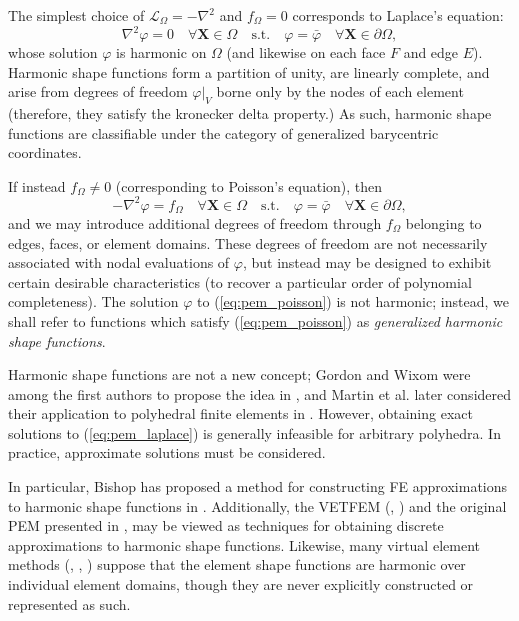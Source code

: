 	The simplest choice of $\mathcal{L}_{\Omega} = -\nabla^2$ and $f_{\Omega} = 0$ corresponds to Laplace's equation:
	\begin{equation}
		\nabla^2 \varphi = 0 \quad \forall \mathbf{X} \in \Omega \quad \text{s.t.} \quad \varphi = \bar{\varphi} \quad \forall \mathbf{X} \in \partial \Omega,
		\label{eq:pem_laplace}
	\end{equation}
	whose solution $\varphi$ is harmonic on $\Omega$ (and likewise on each face $F$ and edge $E$). Harmonic shape functions form a partition of unity, are linearly complete, and arise from degrees of freedom $\varphi|_V$ borne only by the nodes of each element (therefore, they satisfy the kronecker delta property.) As such, harmonic shape functions are classifiable under the category of generalized barycentric coordinates.
	
	If instead $f_{\Omega} \neq 0$ (corresponding to Poisson's equation), then
	\begin{equation}
		-\nabla^2 \varphi = f_{\Omega} \quad \forall \mathbf{X} \in \Omega \quad \text{s.t.} \quad \varphi = \bar{\varphi} \quad \forall \mathbf{X} \in \partial \Omega,
		\label{eq:pem_poisson}
	\end{equation}
	and we may introduce additional degrees of freedom through $f_{\Omega}$ belonging to edges, faces, or element domains. These degrees of freedom are not necessarily associated with nodal evaluations of $\varphi$, but instead may be designed to exhibit certain desirable characteristics (to recover a particular order of polynomial completeness). The solution $\varphi$ to (\ref{eq:pem_poisson}) is not harmonic; instead, we shall refer to functions which satisfy (\ref{eq:pem_poisson}) as \textit{generalized harmonic shape functions}.
	
	Harmonic shape functions are not a new concept; Gordon and Wixom were among the first authors to propose the idea in \cite{Gordon:74}, and Martin et al. later considered their application to polyhedral finite elements in \cite{Martin:08}. However, obtaining exact solutions to (\ref{eq:pem_laplace}) is generally infeasible for arbitrary polyhedra. In practice, approximate solutions must be considered.
	
	In particular, Bishop has proposed a method for constructing FE approximations to harmonic shape functions in \cite{Bishop:14}. Additionally, the VETFEM (\cite{Rashid:00}, \cite{Rashid:06}) and the original PEM presented in \cite{Rashid:12}, may be viewed as techniques for obtaining discrete approximations to harmonic shape functions. Likewise, many virtual element methods (\cite{Chi:17}, \cite{Veiga:13}, \cite{Veiga:15}) suppose that the element shape functions are harmonic over individual element domains, though they are never explicitly constructed or represented as such.
	
